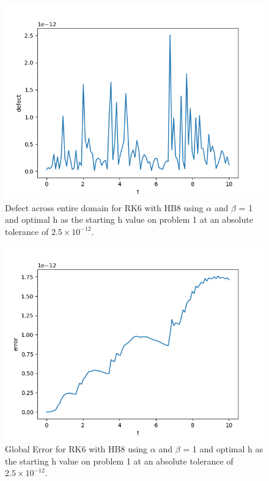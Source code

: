 \begin{figure}[H]
\centering
\includegraphics[width=0.7\linewidth]{./figures/sharp_tolerance_rk6_with_hb8_p1_global_defect}
\caption{Defect across entire domain for RK6 with HB8 using $\alpha$ and $\beta$ = 1 and optimal h as the starting h value on problem 1 at an absolute tolerance of $2.5 \times 10^{-12}$.}
\label{fig:sharp_tolerance_rk6_with_hb8_p1_global_defect}
\end{figure}

\begin{figure}[H]
\centering
\includegraphics[width=0.7\linewidth]{./figures/sharp_tolerance_rk6_with_hb8_p1_global_error}
\caption{Global Error for RK6 with HB8 using $\alpha$ and $\beta$ = 1 and optimal h as the starting h value on problem 1 at an absolute tolerance of $2.5 \times 10^{-12}$.}
\label{fig:sharp_tolerance_rk6_with_hb8_p1_global_error}
\end{figure}

